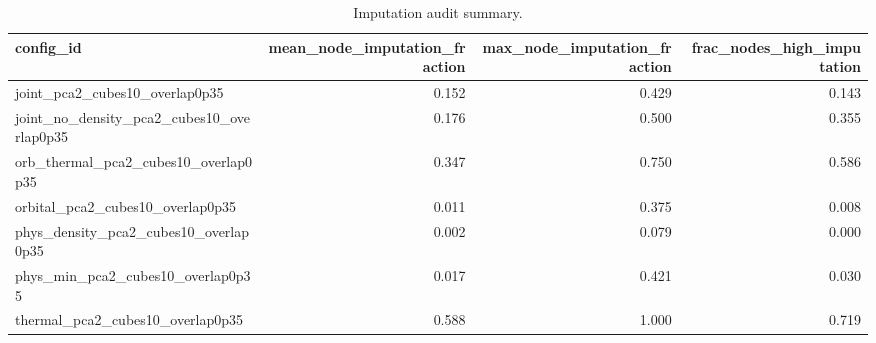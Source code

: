 \begin{table}[p]
\centering
\caption{Imputation audit summary.}
\label{tab:mapper_imputation_audit_summary}
\begin{adjustbox}{max width=\linewidth}
\begin{tabular}{lrrr}
\toprule
config\_id & mean\_node\_imputation\_fraction & max\_node\_imputation\_fraction & frac\_nodes\_high\_imputation \\
\midrule
joint\_pca2\_cubes10\_overlap0p35 & 0.152 & 0.429 & 0.143 \\
joint\_no\_density\_pca2\_cubes10\_overlap0p35 & 0.176 & 0.500 & 0.355 \\
orb\_thermal\_pca2\_cubes10\_overlap0p35 & 0.347 & 0.750 & 0.586 \\
orbital\_pca2\_cubes10\_overlap0p35 & 0.011 & 0.375 & 0.008 \\
phys\_density\_pca2\_cubes10\_overlap0p35 & 0.002 & 0.079 & 0.000 \\
phys\_min\_pca2\_cubes10\_overlap0p35 & 0.017 & 0.421 & 0.030 \\
thermal\_pca2\_cubes10\_overlap0p35 & 0.588 & 1.000 & 0.719 \\
\bottomrule
\end{tabular}
\end{adjustbox}
\end{table}

